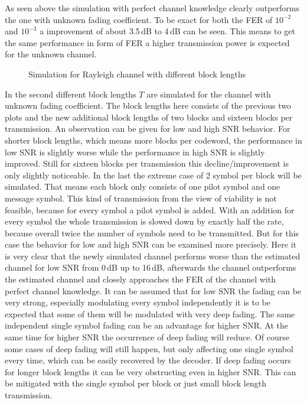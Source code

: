 As seen above the simulation with perfect channel knowledge clearly outperforms the one with unknown fading coefficient. To be exact for both the \gls{FER} of $10^{-2}$ and $10^{-3}$ a improvement of about 3.5\,dB to 4\,dB can be seen. This means to get the same performance in form of \gls{FER} a higher transmission power is expected for the unknown channel.

\begin{figure}[!htb]
	\setlength{}
	\setlength\fheight{0.4\textheight}
	\centering
	
	\caption{Simulation for Rayleigh channel with different block lengths}
	\label{fig:rayfersec}
\end{figure}
In the second  different block lengths \textbf{$T$} are simulated for the channel with unknown fading coefficient. The block lengths here consists of the previous two plots and the new additional block lengths of two blocks and sixteen blocks per transmission.
An observation can be given for low and high \gls{SNR} behavior. For shorter block lengths, which means more blocks per codeword, the performance in low \gls{SNR} is slightly worse while the performance in high \gls{SNR} is slightly improved. Still for sixteen blocks per transmission this decline/improvement is only slightly noticeable.
\newline
In the last  the extreme case of 2 symbol per block will be simulated. That means each block only consists of one pilot symbol and one message symbol. This kind of transmission from the view of viability is not feasible, because for every symbol a pilot symbol is added. With an addition for every symbol the whole transmission is slowed down by exactly half the rate, because overall twice the number of symbols need to be transmitted. But for this case the behavior for low and high SNR can be examined more precisely. 
\newline
Here it is very clear that the newly simulated channel performs worse than the estimated channel for low SNR from 0\,dB up to 16\,dB, afterwards the channel outperforms the estimated channel and closely approaches the \gls{FER} of the channel with perfect channel knowledge. It can be assumed that for low SNR the fading can be very strong, especially modulating every symbol independently it is to be expected that some of them will be modulated with very deep fading. The same independent single symbol fading can be an advantage for higher SNR. At the same time for higher SNR the occurrence of deep fading will reduce. Of course some cases of deep fading will still happen, but only affecting one single symbol every time, which can be easily recovered by the decoder. If deep fading occurs for longer block lengths it can be very obstructing even in higher SNR. This can be mitigated with the single symbol per block or just small block length transmission.
